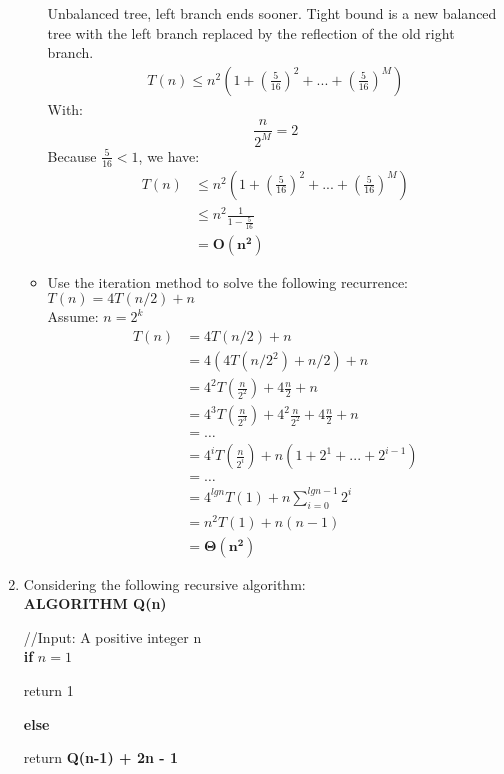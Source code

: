 \documentclass[[11pts]{report}
\begin{document}
\begin{enumerate}
\begin{itemize}
\begin{tikzpicture}[level/.style={sibling distance=60mm/#1}]
\end{tikzpicture}
\par Unbalanced tree, left branch ends sooner. Tight bound is a new balanced tree with the left branch replaced by the reflection of the old right branch.
\begin{align*}
T(n) \leq n^2 (1 + (\frac{5}{16})^2 + ... + (\frac{5}{16})^M)
\end{align*}
With:
\begin{equation*}
\frac{n}{2^M} = 2
\end{equation*}
Because $\frac{5}{16} < 1$, we have:
\begin{align*}
T(n) &\leq n^2 (1 + (\frac{5}{16})^2 + ... + (\frac{5}{16})^M) \\
     &\leq n^2\frac{1}{1-\frac{5}{16}} \\
     &= \mathbf{O(n^2)}
\end{align*}


\item Use the iteration method to solve the following recurrence:
\\ $T(n) = 4T(n/2) + n$
\\ Assume: $n = 2^k$
\begin{align*}
T(n) &= 4T(n/2) + n \\
&= 4(4T(n/2^2) + n/2) + n \\
&= 4^2T(\frac{n}{2^2}) + 4\frac{n}{2} + n \\
&= 4^3T(\frac{n}{2^3}) + 4^2\frac{n}{2^2} +  4\frac{n}{2} + n \\
&= \hdots \\
&= 4^iT(\frac{n}{2^i}) + n(1 + 2^1 + ... + 2^{i-1}) \\
&= \hdots \\
&= 4^{lgn}T(1) + n\sum_{i=0}^{lgn-1}2^i \\
&= n^2T(1) + n(n - 1) \\
&= \mathbf{\Theta(n^2)}
\end{align*}


\end{itemize}

\item Considering the following recursive algorithm:
\\\textbf{ALGORITHM Q(n)}
\par //Input: A positive integer n
\\\textbf{if} $n=1$
\par \quad return 1
\par \textbf{else}
\par \quad return \textbf{Q(n-1) + 2n - 1}


\end{enumerate}
\end{document}
